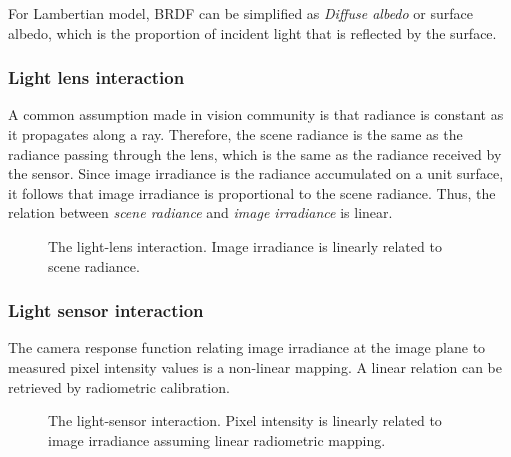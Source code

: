 For Lambertian model, BRDF can be simplified as \textit{Diffuse albedo} or surface albedo, which is the proportion of incident light that is reflected by the surface. 

\subsubsection{Light lens interaction}
A common assumption made in vision community is that radiance is constant as it propagates along a ray. Therefore, the scene radiance is the same as the radiance passing through the lens, which is the same as the radiance received by the sensor. Since image irradiance is the radiance accumulated on a unit surface, it follows that image irradiance is proportional to the scene radiance. Thus, the relation between \textit{scene radiance} and \textit{image irradiance} is linear.
\begin{figure}[!ht]
\centering
{}
\caption{The light-lens interaction. Image irradiance is linearly related to scene radiance.}
\label{fig:light_lens_interact}
\end{figure}

\subsubsection{Light sensor interaction}
The camera response function relating image irradiance at the image plane to measured pixel intensity values is a non-linear mapping. A linear relation can be retrieved by radiometric calibration.
\begin{figure}[!ht]
\centering
{}
\caption{The light-sensor interaction. Pixel intensity is linearly related to image irradiance assuming linear radiometric mapping.}
\label{fig:light_sensor_interact}
\end{figure}

